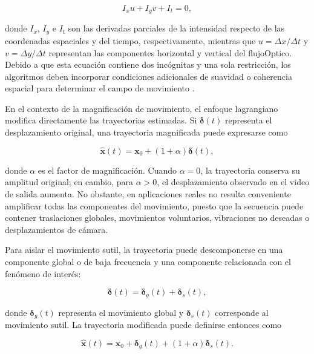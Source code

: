 \begin{equation}
    I_x u+I_y v+I_t=0,
    \label{eq:restriccion_flujo_optico}
\end{equation}

donde $I_x$, $I_y$ e $I_t$ son las derivadas parciales de la intensidad respecto de las coordenadas espaciales y del tiempo, respectivamente, mientras que $u=\Delta x/\Delta t$ y $v=\Delta y/\Delta t$ representan las componentes horizontal y vertical del \gls{flujoOptico}. Debido a que esta ecuación contiene dos incógnitas y una sola restricción, los algoritmos deben incorporar condiciones adicionales de suavidad o coherencia espacial para determinar el campo de movimiento \cite{horn1981flow}.

En el contexto de la magnificación de movimiento, el enfoque lagrangiano modifica directamente las trayectorias estimadas. Si $\boldsymbol{\delta}(t)$ representa el desplazamiento original, una trayectoria magnificada puede expresarse como

\begin{equation}
    \widehat{\mathbf{x}}(t)
    =
    \mathbf{x}_0+(1+\alpha)\boldsymbol{\delta}(t),
    \label{eq:trayectoria_lagrangiana_magnificada}
\end{equation}

donde $\alpha$ es el factor de magnificación. Cuando $\alpha=0$, la trayectoria conserva su amplitud original; en cambio, para $\alpha>0$, el desplazamiento observado en el video de salida aumenta. No obstante, en aplicaciones reales no resulta conveniente amplificar todas las componentes del movimiento, puesto que la secuencia puede contener traslaciones globales, movimientos voluntarios, vibraciones no deseadas o desplazamientos de cámara.

Para aislar el movimiento sutil, la trayectoria puede descomponerse en una componente global o de baja frecuencia y una componente relacionada con el fenómeno de interés:

\begin{equation}
    \boldsymbol{\delta}(t)
    =
    \boldsymbol{\delta}_{g}(t)
    +
    \boldsymbol{\delta}_{s}(t),
    \label{eq:descomposicion_trayectoria}
\end{equation}

donde $\boldsymbol{\delta}_{g}(t)$ representa el movimiento global y $\boldsymbol{\delta}_{s}(t)$ corresponde al movimiento sutil. La trayectoria modificada puede definirse entonces como

\begin{equation}
    \widehat{\mathbf{x}}(t)
    =
    \mathbf{x}_0
    +
    \boldsymbol{\delta}_{g}(t)
    +
    (1+\alpha)\boldsymbol{\delta}_{s}(t).
    \label{eq:magnificacion_selectiva_lagrangiana}
\end{equation}


